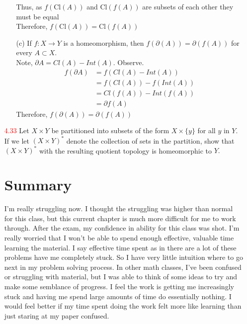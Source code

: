 \documentclass[12pt]{article}
\begin{document}
\begin{enumerate}
\begin{enumerate}
		Thus, as $ f ( \mathrm { Cl } ( A ) ) $ and $ \mathrm { Cl } ( f ( A ) )  $ are subsets of each other they must be equal\\
		Therefore, $ f ( \mathrm { Cl } ( A ) ) = \mathrm { Cl } ( f ( A ) ) $
		\item[(c)] If $f : X \rightarrow Y$ is a homeomorphism, then $f ( \partial ( A ) ) = \partial ( f ( A ) )$ for every	$A \subset X .$\\
		Note, $ \partial A = Cl(A)-Int(A) $. Observe.
			\begin{align*}
				f(\partial A) &= f(Cl(A)-Int(A)) \\
							  &= f(Cl(A)) - f(Int(A))\\
							  &= Cl(f(A)) - Int(f(A))\\
							  &= \partial f(A) 
			\end{align*}
			Therefore, $f ( \partial ( A ) ) = \partial ( f ( A ) )$
	\end{enumerate}
	
	\item[\textcolor{red}{4.33}] Let $X \times Y$ be partitioned into subsets of the form $X \times \{ y \}$ for all $y$ in $Y .$ If we let $( X \times Y ) ^ { * }$ denote the collection of sets in the partition, show that $( X \times Y ) ^ { * }$ with the resulting quotient topology is homeomorphic to $Y .$

	\section*{Summary}
	I'm really struggling now. I thought the struggling was higher than normal for this class, but this current chapter is much more difficult for me to work through. After the exam, my confidence in ability for this class was shot. I'm really worried that I won't be able to spend enough effective, valuable time learning the material. I say effective time spent as in there are a lot of these problems have me completely stuck. So I have very little intuition where to go next in my problem solving process. In other math classes, I've been confused or struggling with material, but I was able to think of some ideas to try and make some semblance of progress. I feel the work is getting me increasingly stuck and having me spend large amounts of time do essentially nothing. I would feel better if my time spent doing the work felt more like learning than just staring at my paper confused.
\end{enumerate}
 
\end{document}

